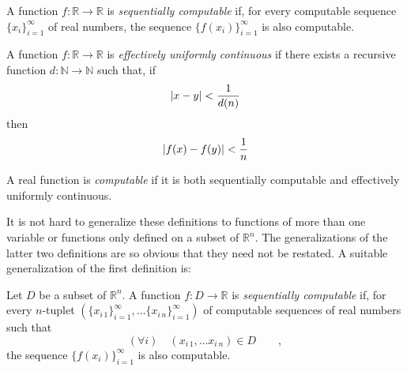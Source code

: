 \documentclass[12pt]{article}
\begin{document}
A function $f \colon \mathbb{R} \to \mathbb{R}$ is \emph{sequentially computable} if, for every computable sequence $\{x_i\}_{i=1}^\infty$ of real numbers, the sequence $\{f(x_i) \}_{i=1}^\infty$ is also computable.

A function $f \colon \mathbb{R} \to \mathbb{R}$ is \emph{effectively uniformly continuous} if there exists a recursive function $d \colon \mathbb{N} \to \mathbb{N}$ such that, if
 $$|x-y| < {1 \over d(n)}$$
then
 $$|f(x) - f(y)| < {1 \over n}$$

A real function is \emph{computable} if it is both sequentially computable and effectively uniformly continuous.

It is not hard to generalize these definitions to functions of more than one variable or functions only defined on a subset of $\mathbb{R}^n$.  The generalizations of the latter two definitions are so obvious that they need not be restated.  A suitable generalization of the first definition is:

Let $D$ be a subset of $\mathbb{R}^n$.  A function $f \colon D \to \mathbb{R}$ is \emph{sequentially computable} if, for every $n$-tuplet $\left( \{ x_{i \, 1} \}_{i=1}^\infty, \ldots \{ x_{i \, n} \}_{i=1}^\infty \right)$ of computable sequences of real numbers such that
 $$(\forall i) \quad (x_{i \, 1}, \ldots x_{i \, n}) \in D \qquad ,$$
the sequence $\{f(x_i) \}_{i=1}^\infty$ is also computable.
\end{document}
